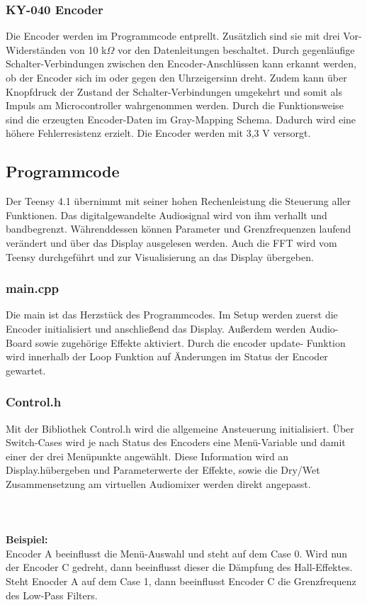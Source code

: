\documentclass[12pt]{article}
\begin{document}
\subsubsection{KY-040 Encoder}
Die Encoder werden im Programmcode entprellt. Zusätzlich sind sie mit drei Vor-Widerständen von 10 k$\Omega$ vor den Datenleitungen beschaltet.
Durch gegenläufige Schalter-Verbindungen zwischen den Encoder-Anschlüssen kann erkannt werden, ob der Encoder sich im oder gegen den Uhrzeigersinn dreht.
Zudem kann über Knopfdruck der Zustand der Schalter-Verbindungen umgekehrt und somit als Impuls am Microcontroller wahrgenommen werden.
Durch die Funktionsweise sind die erzeugten Encoder-Daten im Gray-Mapping Schema. Dadurch wird eine höhere Fehlerresistenz erzielt.
Die Encoder werden mit 3,3 V versorgt.

\subsection{Programmcode}
Der Teensy 4.1 übernimmt mit seiner hohen Rechenleistung die Steuerung aller Funktionen. 
Das digitalgewandelte Audiosignal wird von ihm verhallt und bandbegrenzt. 
Währenddessen können Parameter und Grenzfrequenzen laufend verändert und über das Display ausgelesen werden. 
Auch die FFT wird vom Teensy durchgeführt und zur Visualisierung an das Display übergeben.
\subsubsection{main.cpp}
Die main ist das Herzstück des Programmcodes. Im Setup werden zuerst die Encoder initialisiert und anschließend das Display. 
Außerdem werden Audio-Board sowie zugehörige Effekte aktiviert. 
Durch die \glq encoder update\grq{}\:- Funktion wird innerhalb der Loop Funktion auf Änderungen im Status der Encoder gewartet.
\subsubsection{Control.h}
Mit der Bibliothek \glq Control.h\grq{} wird die allgemeine Ansteuerung initialisiert. 
Über Switch-Cases wird je nach Status des Encoders eine Menü-Variable und damit einer der drei Menüpunkte angewählt. Diese Information wird an \glq Display.h\grq{}\:übergeben 
und Parameterwerte der Effekte, sowie die Dry/Wet Zusammensetzung am virtuellen Audiomixer werden direkt angepasst.
\\
\\
\\
\\
\textbf{Beispiel:}
\\
Encoder A beeinflusst die Menü-Auswahl und steht auf dem Case 0. Wird nun der Encoder C gedreht, dann beeinflusst dieser die Dämpfung des Hall-Effektes.
Steht Enocder A auf dem Case 1, dann beeinflusst Encoder C die Grenzfrequenz des Low-Pass Filters.
\newpage
\end{document}
